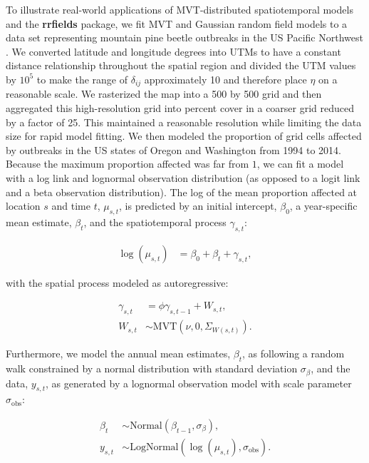 \documentclass[12pt,english]{article}
\begin{document}
\begin{spacing}{1.5}
To illustrate real-world applications of MVT-distributed
spatiotemporal models and the \textbf{rrfields} package,
we fit MVT and Gaussian random field models
to a data set representing
mountain pine beetle outbreaks in the
US Pacific Northwest \citep{usdaforestservice2017}.
We converted latitude and longitude degrees into UTMs to have a constant
distance relationship throughout the spatial region and divided the UTM values
by $10^5$ to make the range of $\delta_{ij}$ approximately 10 and therefore
place $\eta$ on a reasonable scale.
We rasterized the map into a 500 by 500 grid
and then aggregated this high-resolution grid
into percent cover in a coarser grid reduced by a factor of 25.
This maintained a reasonable resolution
while limiting the data size for rapid model fitting.
We then modeled the
proportion of grid cells affected by outbreaks
in the US states of Oregon and Washington from 1994 to 2014.
Because the maximum proportion affected was far from $1$, we
can fit a model with a log link and lognormal observation distribution
(as opposed to a logit link and a beta observation distribution).
The log of the mean proportion affected at location $s$ and time $t$, $\mu_{s,t}$,
is predicted by an initial intercept, $\beta_0$, a year-specific mean estimate, $\beta_t$,
and the spatiotemporal process $\gamma_{s,t}$:

\begin{align}
  \log(\mu_{s,t}) &= \beta_0 + \beta_t + \gamma_{s,t},
  \end{align}

\noindent with the spatial process modeled as autoregressive:

\begin{align}
    \gamma_{s,t} &= \phi \gamma_{s,t-1} + W_{s,t},\\ \label{eq:beetle-mu}
     W_{s,t} &\sim \mathrm{MVT}\left(\nu, 0, \Sigma_{W(s,t)}\right).
 \end{align}

\noindent Furthermore, we model the annual
mean estimates, $\beta_t$, as following a random walk
constrained by a normal distribution with standard deviation $\sigma_{\beta}$,
and the data, $y_{s,t}$, as generated by a lognormal observation model
with scale parameter $\sigma_{\mathrm{obs}}$:

 \begin{align}
 \beta_t &\sim \mathrm{Normal}\left( \beta_{t-1}, \sigma_{\beta} \right),\\
  y_{s,t} &\sim \mathrm{LogNormal} \left(  \log(\mu_{s,t}), \sigma_{\mathrm{obs}} \right).
 \end{align}


\end{spacing}
\end{document}
